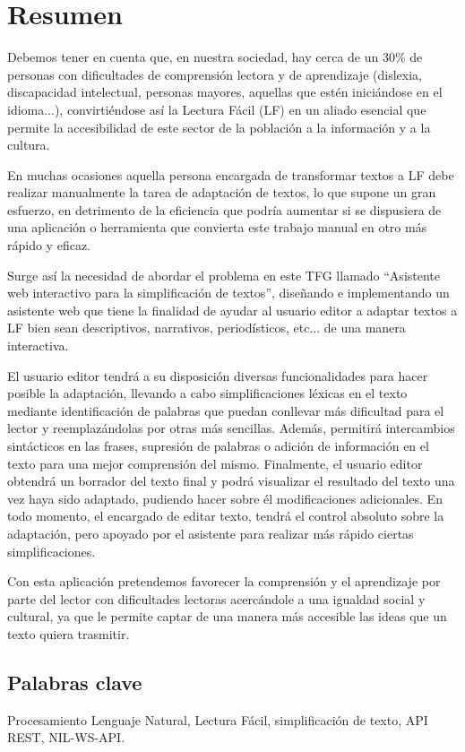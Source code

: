 \chapter*{Resumen}

Debemos tener en cuenta que, en nuestra sociedad, hay cerca de un 30\% de personas con dificultades de comprensión lectora y de aprendizaje (dislexia, discapacidad intelectual, personas mayores, aquellas que estén iniciándose en el idioma...), convirtiéndose así la Lectura Fácil (LF) en un aliado esencial que permite la accesibilidad de este sector de la población a la información y a la cultura. 

 \setlength{\parskip}{10pt}

En muchas ocasiones aquella persona encargada de transformar textos a LF debe realizar manualmente la tarea de adaptación de textos, lo que supone un gran esfuerzo, en detrimento de la eficiencia que podría aumentar si se dispusiera de una aplicación o herramienta que convierta este trabajo manual en otro más rápido y eficaz.

 \setlength{\parskip}{10pt}

Surge así la necesidad de abordar el problema en este TFG llamado ``Asistente web interactivo para la simplificación de textos'', diseñando e implementando un asistente web que tiene la finalidad de ayudar al usuario editor a adaptar textos a LF bien sean descriptivos, narrativos, periodísticos, etc... de una manera interactiva. 

 \setlength{\parskip}{10pt}

El usuario editor tendrá a su disposición diversas funcionalidades para hacer posible la adaptación, llevando a cabo simplificaciones léxicas en el texto mediante identificación de palabras que puedan conllevar más dificultad para el lector y reemplazándolas por otras más sencillas. Además, permitirá intercambios sintácticos en las frases, supresión de palabras o adición de información en el texto para una mejor comprensión del mismo. Finalmente, el usuario editor obtendrá un borrador del texto final y podrá visualizar el resultado del texto una vez haya sido adaptado, pudiendo hacer sobre él modificaciones adicionales. En todo momento, el encargado de editar texto, tendrá el control absoluto sobre la adaptación, pero apoyado por el asistente para realizar más rápido ciertas simplificaciones.

 \setlength{\parskip}{10pt}

Con esta aplicación pretendemos favorecer la comprensión y el aprendizaje por parte del lector con dificultades lectoras acercándole a una igualdad social y cultural, ya que le permite captar de una manera más accesible las ideas que un texto quiera trasmitir.



\section*{Palabras clave}
   
\noindent Procesamiento Lenguaje Natural, Lectura Fácil, simplificación de texto, API REST, NIL-WS-API.

   



